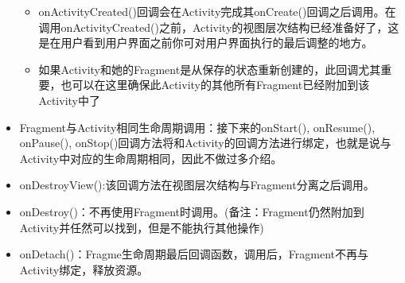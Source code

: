 \documentclass[9pt, b5paper]{article}
\begin{document}
\begin{itemize}
\begin{itemize}
\item onActivityCreated()回调会在Activity完成其onCreate()回调之后调用。在调用onActivityCreated()之前，Activity的视图层次结构已经准备好了，这是在用户看到用户界面之前你可对用户界面执行的最后调整的地方。
\item 如果Activity和她的Fragment是从保存的状态重新创建的，此回调尤其重要，也可以在这里确保此Activity的其他所有Fragment已经附加到该Activity中了
\end{itemize}
\item Fragment与Activity相同生命周期调用：接下来的onStart(), onResume(), onPause(), onStop()回调方法将和Activity的回调方法进行绑定，也就是说与Activity中对应的生命周期相同，因此不做过多介绍。
\item onDestroyView():该回调方法在视图层次结构与Fragment分离之后调用。
\item onDestroy()：不再使用Fragment时调用。(备注：Fragment仍然附加到Activity并任然可以找到，但是不能执行其他操作)
\item onDetach()：Fragme生命周期最后回调函数，调用后，Fragment不再与Activity绑定，释放资源。
\end{itemize}
\end{document}
